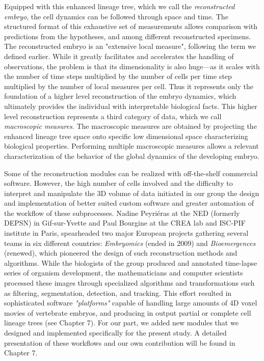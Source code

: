 Equipped with this enhanced lineage tree, which we call the \textit{reconstructed embryo}, the cell dynamics can be followed through space and time. The structured format of this exhaustive set of measurements allows comparison with predictions from the hypotheses, and among different reconstructed specimens. The reconstructed embryo is an "extensive local measure", following the term we defined earlier. While it greatly facilitates and accelerates the handling of observations, the problem is that its dimensionality is also huge---as it scales with the number of time steps multiplied by the number of cells per time step multiplied by the number of local measures per cell. Thus it represents only the foundation of a higher level reconstruction of the embryo dynamics, which ultimately provides the individual with interpretable biological facts. This higher level reconstruction represents a third category of data, which we call \textit{macroscopic measures}. The macroscopic measures are obtained by projecting the enhanced lineage tree space onto specific low dimensional space characterizing biological properties. Performing multiple macroscopic measures allows a relevant characterization of the behavior of the global dynamics of the developing embryo.

Some of the reconstruction modules can be realized with off-the-shelf commercial software. However, the high number of cells involved and the difficulty to interpret and manipulate the 3D volume of data initiated in our group the design and implementation of better suited custom software and greater automation of the workflow of these subprocesses. Nadine Peyri\'eras at the NED (formerly DEPSN) in Gif-sur-Yvette and Paul Bourgine at the CREA lab and ISC-PIF institute in Paris, spearheaded two major European projects gathering several teams in six different countries: \textit{Embryomics} (ended in 2009) and \textit{Bioemergences} (renewed), which pioneered the design of such reconstruction methods and algorithms. While the biologists of the group produced and annotated time-lapse series of organism development, the mathematicians and computer scientists processed these images through specialized algorithms and transformations such as filtering, segmentation, detection, and tracking. This effort resulted in sophisticated software \textit{"platforms"} capable of handling large amounts of 4D voxel movies of vertebrate embryos, and producing in output partial or complete cell lineage trees (see Chapter 7). For our part, we added new modules that we designed and implemented specifically for the present study. A detailed presentation of these workflows and our own contribution will be found in Chapter 7.

